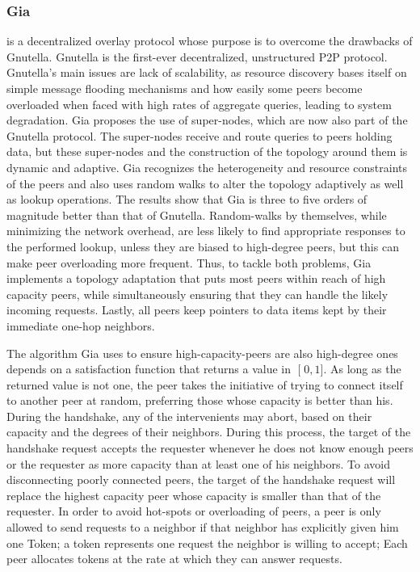 \documentclass[runningheads]{llncs}
\begin{document}
\subsubsection{Gia} \cite{gia} is a decentralized overlay protocol whose purpose is to overcome the drawbacks of Gnutella. Gnutella is the first-ever decentralized, unstructured P2P protocol. Gnutella's main issues are lack of scalability, as resource discovery bases itself on simple message flooding mechanisms and how easily some peers become overloaded when faced with high rates of aggregate queries, leading to system degradation. Gia proposes the use of super-nodes, which are now also part of the Gnutella protocol. The super-nodes receive and route queries to peers holding data, but these super-nodes and the construction of the topology around them is dynamic and adaptive. Gia recognizes the heterogeneity and resource constraints of the peers and also uses random walks to alter the topology adaptively as well as lookup operations. The results show that Gia is three to five orders of magnitude better than that of Gnutella. Random-walks by themselves, while minimizing the network overhead, are less likely to find appropriate responses to the performed lookup, unless they are biased to high-degree peers, but this can make peer overloading more frequent. Thus, to tackle both problems, Gia implements a topology adaptation that puts most peers within reach of high capacity peers, while simultaneously ensuring that they can handle the likely incoming requests. Lastly, all peers keep pointers to data items kept by their immediate one-hop neighbors.

The algorithm Gia uses to ensure high-capacity-peers are also high-degree ones depends on a satisfaction function that returns a value in $\mathclose[0,1\mathclose]$. As long as the returned value is not one, the peer takes the initiative of trying to connect itself to another peer at random, preferring those whose capacity is better than his. During the handshake, any of the intervenients may abort, based on their capacity and the degrees of their neighbors. During this process, the target of the handshake request accepts the requester whenever he does not know enough peers or the requester as more capacity than at least one of his neighbors. To avoid disconnecting poorly connected peers, the target of the handshake request will replace the highest capacity peer whose capacity is smaller than that of the requester. In order to avoid hot-spots or overloading of peers, a peer is only allowed to send requests to a neighbor if that neighbor has explicitly given him one Token; a token represents one request the neighbor is willing to accept; Each peer allocates tokens at the rate at which they can answer requests.
\end{document}
